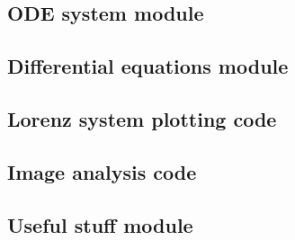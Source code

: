 \documentclass[twocolumn]{myarticle}
\begin{document}
\subsection{ODE system module}
\label{subsec:ode_system_module}


\vspace{10pt}

\subsection{Differential equations module}
\label{subsec:differential_equations_module}


\vspace{10pt}

\subsection{Lorenz system plotting code}
\label{subsec:lorenz_system_plotting_code}


\vspace{10pt}

\subsection{Image analysis code}
\label{subsec:image_analysis_code}


\vspace{10pt}

\subsection{Useful stuff module}
\label{subsec:useful_stuff_module}


\end{document}

